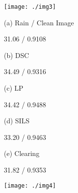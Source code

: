 \documentclass[10pt,twocolumn,letterpaper]{article}
\begin{document}
\begin{figure*}
\centering
\begin{minipage}[t]{0.85\textwidth}
\centering
\texttt{[image: ./img3]}
\end{minipage}

\begin{minipage}[t]{0.17\textwidth}
\centerline{\footnotesize (a) Rain / Clean Image}
\centerline{\footnotesize 31.06 / 0.9108 }
\end{minipage}
\centering
\begin{minipage}[t]{0.17\linewidth}
\centerline{\footnotesize (b) DSC~\cite{luo:iccv:2015:dsc}}
\centerline{\footnotesize 34.49 / 0.9316}
\end{minipage}
\begin{minipage}[t]{0.17\linewidth}
\centerline{\footnotesize (c) LP~\cite{li:cvpr:2016:lp}}
\centerline{\footnotesize 34.42 / 0.9488 }
\end{minipage}
\begin{minipage}[t]{0.17\linewidth}
\centerline{\footnotesize (d) SILS~\cite{gu:iccv:2017:sils}}
\centerline{\footnotesize 33.20 / 0.9463 }
\end{minipage}
\begin{minipage}[t]{0.17\linewidth}
\centerline{\footnotesize (e) Clearing~\cite{fu:tip:2016:clearing}}
\centerline{\footnotesize 31.82 / 0.9353}
\end{minipage}

\begin{minipage}[t]{\textwidth}
\centerline{  }
\end{minipage}

\begin{minipage}[t]{0.85\textwidth}
\texttt{[image: ./img4]}
\end{minipage}


\end{figure*}
\end{document}
